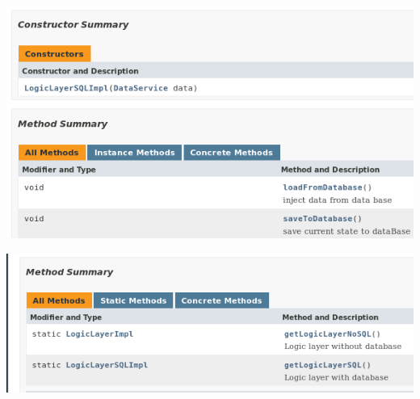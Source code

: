 \documentclass[a4paper,12pt]{article}
\begin{document}
\begin{minipage}{0.8\textwidth}
\end{minipage}

\begin{minipage}{\textwidth}

    \includegraphics[width=\textwidth]{./screen/logicLayer/LogicLayerSQLImpl.png}
    \label{LogicLayerSQLImpl}

\end{minipage}

\begin{minipage}{\textwidth}

    \includegraphics[width=\textwidth]{./screen/logicLayer/LogicLayerFactory.png}
    \label{LogicLayerFactory}

\end{minipage}
\end{document}

